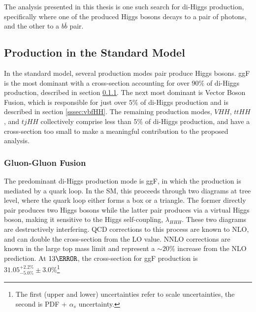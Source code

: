 The analysis presented in this thesis is one such search for di-Higgs production, specifically where one of the produced Higgs bosons decays to a pair of photons, and the other to a $b\bar{b}$ pair.

\subsection{Production in the Standard Model}
In the standard model, several production modes pair produce Higgs bosons. \gls{ggF} is the most dominant with a cross-section accounting for over $90\%$ of di-Higgs production, described in section \ref{sssec:ggfHH}. The next most dominant is Vector Boson Fusion, which is responsible for just over $5\%$ of di-Higgs production and is described in section \ref{sssec:vbfHH}. The remaining production modes, $VHH$, $ttHH$, and $tjHH$ collectively comprise less than 5\% of di-Higgs production, and have a cross-section too small to make a meaningful contribution to the proposed analysis.

\subsubsection{Gluon-Gluon Fusion} \label{sssec:ggfHH}

The predominant di-Higgs production mode is \gls{ggF}, in which the production is mediated by a quark loop. In the \gls{SM}, this proceeds through two diagrams at tree level, where the quark loop either forms a box or a triangle. The former directly pair produces two Higgs bosons while the latter pair produces via a virtual Higgs boson, making it sensitive to the Higgs self-coupling, $\lambda_{HHH}$. These two diagrams are destructively interfering. QCD corrections to this process are known to \gls{NLO}, and can double the cross-section from the \gls{LO} value. \gls{NNLO} corrections are known in the large top mass limit and represent a $\sim 20\%$ increase from the \gls{NLO} prediction. At $\unit{13}{\TeV}$, the cross-section for \gls{ggF} production is $31.05^{+2.2\%}_{-5.0\%} \pm 3.0\%$\footnote{The first (upper and lower) uncertainties refer to scale uncertainties, the second is PDF + $\alpha_s$ uncertainty.}  \cite{hh-crosssections}

